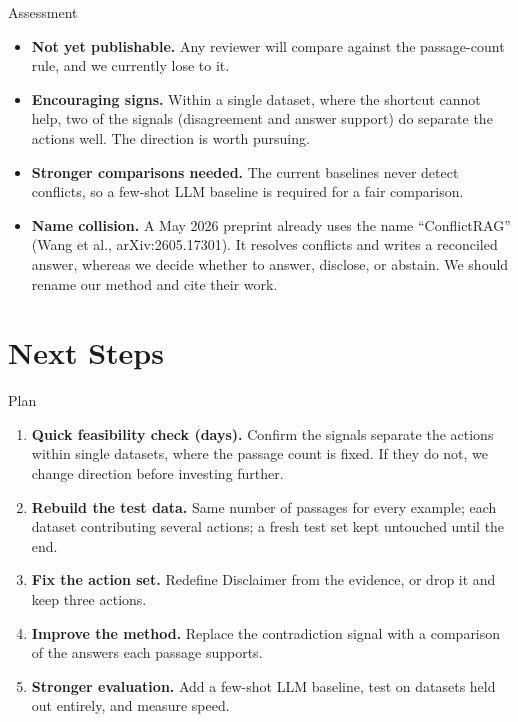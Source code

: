 \documentclass[aspectratio=169]{beamer}
\begin{document}
\begin{frame}{Assessment}
  \begin{itemize}
    \item \textbf{Not yet publishable.} Any reviewer will compare against the passage-count
      rule, and we currently lose to it.
    \vspace{0.15cm}
    \item \textbf{Encouraging signs.} Within a single dataset, where the shortcut cannot help,
      two of the signals (disagreement and answer support) do separate the actions well. The
      direction is worth pursuing.
    \vspace{0.15cm}
    \item \textbf{Stronger comparisons needed.} The current baselines never detect conflicts,
      so a few-shot LLM baseline is required for a fair comparison.
    \vspace{0.15cm}
    \item \textbf{Name collision.} A May 2026 preprint already uses the name
      ``ConflictRAG'' (Wang et al., arXiv:2605.17301). It resolves conflicts and writes a
      reconciled answer, whereas we decide whether to answer, disclose, or abstain. We should
      rename our method and cite their work.
  \end{itemize}
\end{frame}

\section{Next Steps}

\begin{frame}{Plan}
  \begin{enumerate}
    \item \textbf{Quick feasibility check (days).} Confirm the signals separate the actions
      within single datasets, where the passage count is fixed. If they do not, we change
      direction before investing further.
    \vspace{0.15cm}
    \item \textbf{Rebuild the test data.} Same number of passages for every example; each
      dataset contributing several actions; a fresh test set kept untouched until the end.
    \vspace{0.15cm}
    \item \textbf{Fix the action set.} Redefine Disclaimer from the evidence, or drop it and
      keep three actions.
    \vspace{0.15cm}
    \item \textbf{Improve the method.} Replace the contradiction signal with a comparison of
      the answers each passage supports.
    \vspace{0.15cm}
    \item \textbf{Stronger evaluation.} Add a few-shot LLM baseline, test on datasets held out
      entirely, and measure speed.
  \end{enumerate}
\end{frame}
\end{document}
